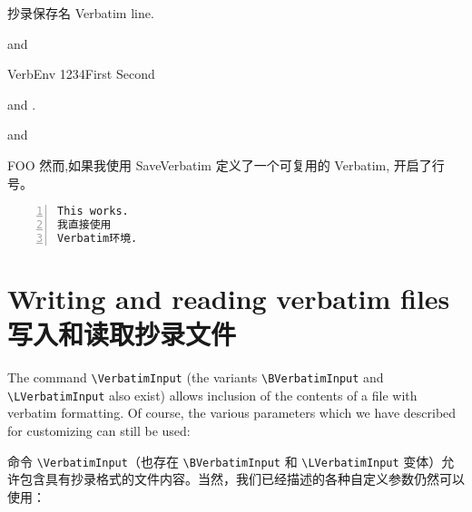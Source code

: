 \documentclass[twoside]{article}
\newcommand\cs[1]{\texttt{\textbackslash#1}}
\begin{document}
\begin{SideBySideExample}
  \begin{SaveVerbatim}{抄录保存名}
    Verbatim line.
  \end{SaveVerbatim}
  and 
\end{SideBySideExample}

\begin{SideBySideExample}
  \begin{SaveVerbatim}[gobble=5]%
    {VerbEnv}
1234First
    Second
  \end{SaveVerbatim}

  and .

   and
\end{SideBySideExample}


\begin{SideBySideExample}
\begin{SaveVerbatim}{FOO}
然而,如果我使用
SaveVerbatim
定义了一个可复用的
Verbatim,
开启了行号。
\end{SaveVerbatim}

\begin{Verbatim}[numbers=left]
This works.
我直接使用
Verbatim环境.
\end{Verbatim}

\end{SideBySideExample}


\clearpage

\section{Writing and reading verbatim files\\写入和读取抄录文件}
\label{sec:VerbatimInclude}


The command \cs{VerbatimInput} (the variants \cs{BVerbatimInput} and
\cs{LVerbatimInput} also exist) allows inclusion of the contents of a file
with verbatim formatting. Of course, the various parameters which we have
described for customizing can still be used:

命令 \cs{VerbatimInput}（也存在 \cs{BVerbatimInput} 和 \cs{LVerbatimInput} 变体）允许包含具有抄录格式的文件内容。当然，我们已经描述的各种自定义参数仍然可以使用：
\end{document}
